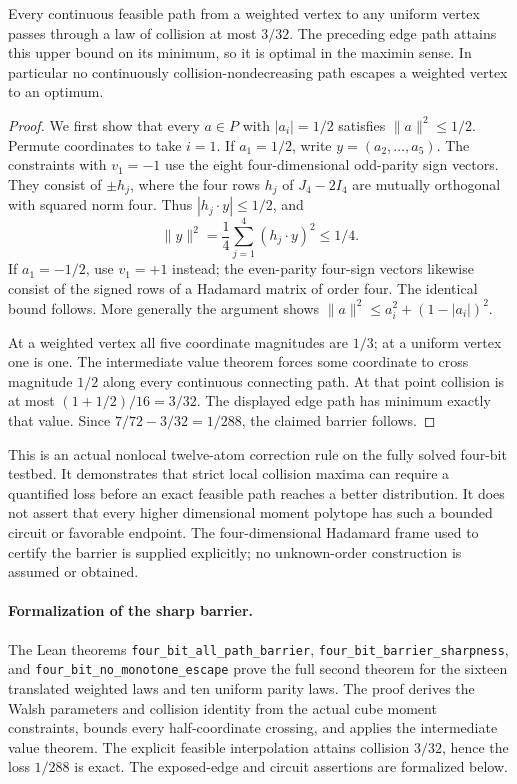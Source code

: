 \begin{theorem}
Every continuous feasible path from a weighted vertex to any uniform
vertex passes through a law of collision at most $3/32$.
The preceding edge path attains this upper bound on its minimum, so
it is optimal in the maximin sense. In particular no continuously
collision-nondecreasing path escapes a weighted vertex to an optimum.
\end{theorem}
\begin{proof}
We first show that every $a\in P$ with $|a_i|=1/2$ satisfies
$\|a\|^2\le1/2$. Permute coordinates to take $i=1$.
If $a_1=1/2$, write $y=(a_2,\ldots,a_5)$. The constraints with
$v_1=-1$ use the eight four-dimensional odd-parity sign vectors.
They consist of $\pm h_j$, where the four rows $h_j$ of $J_4-2I_4$
are mutually orthogonal with squared norm four. Thus
$|h_j\cdot y|\le1/2$, and
\[
 \|y\|^2=\frac14\sum_{j=1}^4(h_j\cdot y)^2\le1/4.
\]
If $a_1=-1/2$, use $v_1=+1$ instead; the even-parity four-sign
vectors likewise consist of the signed rows of a Hadamard matrix
of order four. The identical bound follows. More generally the
argument shows $\|a\|^2\le a_i^2+(1-|a_i|)^2$.

At a weighted vertex all five coordinate magnitudes are $1/3$;
at a uniform vertex one is one. The intermediate value theorem
forces some coordinate to cross magnitude $1/2$ along every
continuous connecting path. At that point collision is at most
$(1+1/2)/16=3/32$. The displayed edge path has minimum exactly that
value. Since $7/72-3/32=1/288$, the claimed barrier follows.
\end{proof}

This is an actual nonlocal twelve-atom correction rule on the fully
solved four-bit testbed. It demonstrates that strict local collision
maxima can require a quantified loss before an exact feasible path
reaches a better distribution. It does not assert that every higher
dimensional moment polytope has such a bounded circuit or favorable
endpoint. The four-dimensional Hadamard frame used to certify the
barrier is supplied explicitly; no unknown-order construction is
assumed or obtained.


\paragraph{Formalization of the sharp barrier.} The Lean theorems \texttt{four\_\allowbreak bit\_\allowbreak all\_\allowbreak path\_\allowbreak barrier}, \texttt{four\_\allowbreak bit\_\allowbreak barrier\_\allowbreak sharpness}, and \texttt{four\_\allowbreak bit\_\allowbreak no\_\allowbreak monotone\_\allowbreak escape} prove the full second theorem for the sixteen translated weighted laws and ten uniform parity laws. The proof derives the Walsh parameters and collision identity from the actual cube moment constraints, bounds every half-coordinate crossing, and applies the intermediate value theorem. The explicit feasible interpolation attains collision $3/32$, hence the loss $1/288$ is exact. The exposed-edge and circuit assertions are formalized below.

